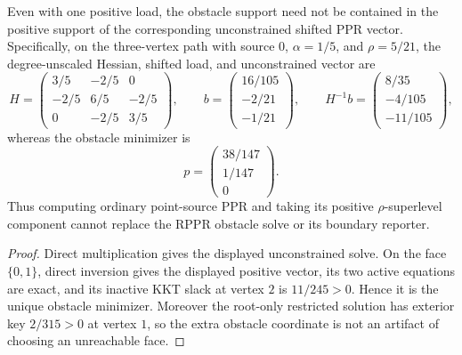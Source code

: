 \begin{proposition}
\label{prop:aesp-cd-point-source-superlevel-stop}
Even with one positive load, the obstacle support need not be contained in
the positive support of the corresponding unconstrained shifted PPR vector.
Specifically, on the three-vertex path with source $0$,
$\alpha=1/5$, and $\rho=5/21$, the degree-unscaled Hessian, shifted load,
and unconstrained vector are
\begin{equation*}
 H=\begin{pmatrix}
  3/5&-2/5&0\\ -2/5&6/5&-2/5\\0&-2/5&3/5
 \end{pmatrix},\qquad
 b=\begin{pmatrix}16/105\\-2/21\\-1/21\end{pmatrix},\qquad
 H^{-1}b=\begin{pmatrix}8/35\\-4/105\\-11/105\end{pmatrix},
\end{equation*}
whereas the obstacle minimizer is
\begin{equation*}
 p=\begin{pmatrix}38/147\\1/147\\0\end{pmatrix}.
\end{equation*}
Thus computing ordinary point-source PPR and taking its positive
$\rho$-superlevel component cannot replace the RPPR obstacle solve or its
boundary reporter.
\end{proposition}

\begin{proof}
Direct multiplication gives the displayed unconstrained solve.  On the face
$\{0,1\}$, direct inversion gives the displayed positive vector, its two
active equations are exact, and its inactive KKT slack at vertex $2$ is
$11/245>0$.  Hence it is the unique obstacle minimizer.  Moreover the
root-only restricted solution has exterior key $2/315>0$ at vertex $1$, so
the extra obstacle coordinate is not an artifact of choosing an unreachable
face.
\end{proof}

